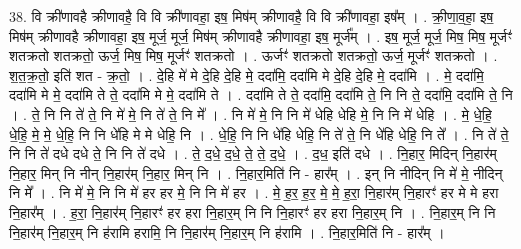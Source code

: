 \documentclass[17pt]{extarticle}
\begin{document}
38. वि क्री॑णावहै क्रीणावहै॒ वि वि क्री॑णावहा॒ इष॒ मिष॑म् क्रीणावहै॒ वि वि क्री॑णावहा॒ इष᳚म् । . क्री॒णा॒व॒हा॒ इष॒ मिष॑म् क्रीणावहै क्रीणावहा॒ इष॒ मूर्ज॒ मूर्ज॒ मिष॑म् क्रीणावहै क्रीणावहा॒ इष॒ मूर्ज᳚म् । . इष॒ मूर्ज॒ मूर्ज॒ मिष॒ मिष॒ मूर्जꣳ॑ शतक्रतो शतक्रतो॒ ऊर्ज॒ मिष॒ मिष॒ मूर्जꣳ॑ शतक्रतो । . ऊर्जꣳ॑ शतक्रतो शतक्रतो॒ ऊर्ज॒ मूर्जꣳ॑ शतक्रतो । . श॒त॒क्र॒तो॒ इति॑ शत - क्र॒तो॒ । . दे॒हि मे॑ मे दे॒हि दे॒हि मे॒ ददा॑मि॒ ददा॑मि मे दे॒हि दे॒हि मे॒ ददा॑मि । . मे॒ ददा॑मि॒ ददा॑मि मे मे॒ ददा॑मि ते ते॒ ददा॑मि मे मे॒ ददा॑मि ते । . ददा॑मि ते ते॒ ददा॑मि॒ ददा॑मि ते॒ नि नि ते॒ ददा॑मि॒ ददा॑मि ते॒ नि । . ते॒ नि नि ते॑ ते॒ नि मे॑ मे॒ नि ते॑ ते॒ नि मे᳚ । . नि मे॑ मे॒ नि नि मे॑ धेहि धेहि मे॒ नि नि मे॑ धेहि । . मे॒ धे॒हि॒ धे॒हि॒ मे॒ मे॒ धे॒हि॒ नि नि धे॑हि मे मे धेहि॒ नि । . धे॒हि॒ नि नि धे॑हि धेहि॒ नि ते॑ ते॒ नि धे॑हि धेहि॒ नि ते᳚ । . नि ते॑ ते॒ नि नि ते॑ दधे दधे ते॒ नि नि ते॑ दधे । . ते॒ द॒धे॒ द॒धे॒ ते॒ ते॒ द॒धे॒ । . द॒ध॒ इति॑ दधे । . नि॒हार॒ मिदिन् नि॒हार॑म् नि॒हार॒ मिन् नि नीन् नि॒हार॑म् नि॒हार॒ मिन् नि । . नि॒हार॒मिति॑ नि - हार᳚म् । . इन् नि नीदिन् नि मे॑ मे॒ नीदिन् नि मे᳚ । . नि मे॑ मे॒ नि नि मे॑ हर हर मे॒ नि नि मे॑ हर । . मे॒ ह॒र॒ ह॒र॒ मे॒ मे॒ ह॒रा॒ नि॒हार॑म् नि॒हारꣳ॑ हर मे मे हरा नि॒हार᳚म् । . ह॒रा॒ नि॒हार॑म् नि॒हारꣳ॑ हर हरा नि॒हार॒म् नि नि नि॒हारꣳ॑ हर हरा नि॒हार॒म् नि । . नि॒हार॒म् नि नि नि॒हार॑म् नि॒हार॒म् नि ह॑रामि हरामि॒ नि नि॒हार॑म् नि॒हार॒म् नि ह॑रामि । . नि॒हार॒मिति॑ नि - हार᳚म् । \newline
\pagebreak
{}
\end{document}
